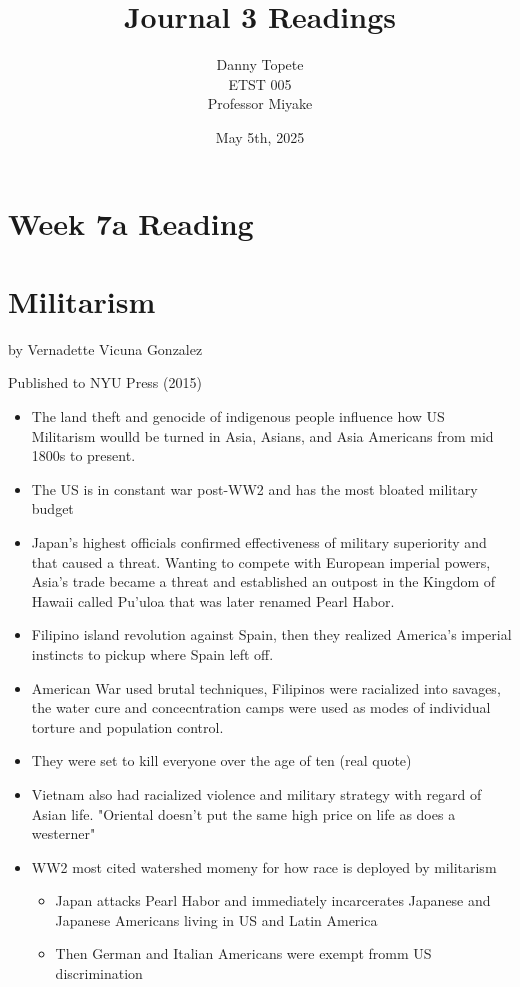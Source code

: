 \documentclass{article}
\title{Journal 3 Readings}
\author{Danny Topete\\ ETST 005\\ Professor Miyake}
\date{May 5th, 2025}
\begin{document}
\maketitle


  \section*{Week 7a Reading}
  \section{Militarism}
  by Vernadette Vicuna Gonzalez

  Published to NYU Press (2015)

  \begin{itemize}
    \item The land theft and genocide of indigenous people
      influence how US Militarism woulld be turned
      in Asia, Asians, and Asia Americans from mid 1800s to present.
    \item The US is in constant war post-WW2 and has the most bloated military budget
    \item Japan's highest officials confirmed
      effectiveness of military superiority and that caused a threat.
      Wanting to compete with European imperial powers, Asia's trade became a threat and
      established an outpost in the Kingdom of Hawaii called Pu'uloa that was
      later renamed Pearl Habor.
    \item Filipino island revolution against Spain, then they realized
      America's imperial instincts to pickup where Spain left off.
    \item American War used brutal techniques,
      Filipinos were racialized into savages, the water cure
      and concecntration camps were used as modes of individual torture and population control.
    \item They were set to kill everyone over the age of ten (real quote)
    \item Vietnam also had racialized violence and military strategy with
      regard of Asian life. "Oriental doesn't put the same high price on life as does a westerner"
    \item WW2 most cited watershed momeny for how race is deployed by militarism
      \begin{itemize}
        \item Japan attacks Pearl Habor and immediately incarcerates Japanese and Japanese Americans
          living in US and Latin America
        \item Then German and Italian Americans were exempt fromm US discrimination
      \end{itemize}
  \end{itemize}
\end{document}
